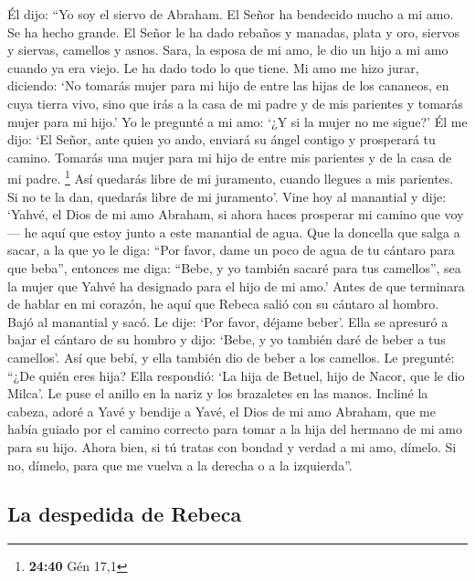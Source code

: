 \begin{paracol}{2}
 Él dijo: ``Yo soy el siervo de Abraham. 
El Señor ha bendecido mucho a mi amo. Se ha hecho grande. El Señor le ha
dado rebaños y manadas, plata y oro, siervos y siervas, camellos y
asnos.  Sara, la esposa de mi amo, le dio un hijo a mi
amo cuando ya era viejo. Le ha dado todo lo que tiene. 
Mi amo me hizo jurar, diciendo: `No tomarás mujer para mi hijo de entre
las hijas de los cananeos, en cuya tierra vivo,  sino que
irás a la casa de mi padre y de mis parientes y tomarás mujer para mi
hijo.'  Yo le pregunté a mi amo: `¿Y si la mujer no me
sigue?'  Él me dijo: `El Señor, ante quien yo ando,
enviará su ángel contigo y prosperará tu camino. Tomarás una mujer para
mi hijo de entre mis parientes y de la casa de mi padre. \footnote{\textbf{24:40}
  Gén 17,1}  Así quedarás libre de mi juramento, cuando
llegues a mis parientes. Si no te la dan, quedarás libre de mi
juramento'.  Vine hoy al manantial y dije: `Yahvé, el
Dios de mi amo Abraham, si ahora haces prosperar mi camino que voy ---
 he aquí que estoy junto a este manantial de agua. Que la
doncella que salga a sacar, a la que yo le diga: ``Por favor, dame un
poco de agua de tu cántaro para que beba'',  entonces me
diga: ``Bebe, y yo también sacaré para tus camellos'', sea la mujer que
Yahvé ha designado para el hijo de mi amo.'  Antes de que
terminara de hablar en mi corazón, he aquí que Rebeca salió con su
cántaro al hombro. Bajó al manantial y sacó. Le dije: `Por favor, déjame
beber'.  Ella se apresuró a bajar el cántaro de su hombro
y dijo: `Bebe, y yo también daré de beber a tus camellos'. Así que bebí,
y ella también dio de beber a los camellos.  Le pregunté:
``¿De quién eres hija? Ella respondió: `La hija de Betuel, hijo de
Nacor, que le dio Milca'. Le puse el anillo en la nariz y los brazaletes
en las manos.  Incliné la cabeza, adoré a Yavé y bendije
a Yavé, el Dios de mi amo Abraham, que me había guiado por el camino
correcto para tomar a la hija del hermano de mi amo para su hijo.
 Ahora bien, si tú tratas con bondad y verdad a mi amo,
dímelo. Si no, dímelo, para que me vuelva a la derecha o a la
izquierda''.

\hypertarget{la-despedida-de-rebeca}{%
\subsection{La despedida de Rebeca}\label{la-despedida-de-rebeca}}


\end{paracol}
